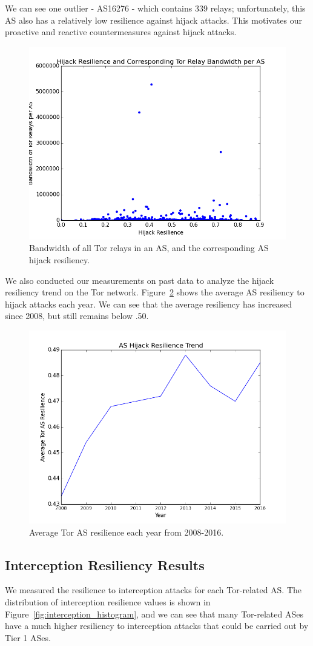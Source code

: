 We can see one outlier - AS16276 - which contains 339 relays; unfortunately, this AS also has a relatively low resilience against hijack attacks.  This motivates our proactive and reactive countermeasures against hijack attacks.

\begin{figure}
\centering
\includegraphics[width=.5\textwidth]{hijack_bandwidth}
\caption{Bandwidth of all Tor relays in an AS, and the corresponding AS hijack resiliency.}
\label{fig:hijack_bw}
\end{figure}

We also conducted our measurements on past data to analyze the hijack resiliency trend on the Tor network.  Figure~\ref{fig:resilience_trend} shows the average AS resiliency to hijack attacks each year.  We can see that the average resiliency has increased since 2008, but still remains below .50.  

\begin{figure}
\centering
\includegraphics[width=.5\textwidth]{hijack_resilience_trend}
\caption{Average Tor AS resilience each year from 2008-2016.}
\label{fig:resilience_trend}
\end{figure}

\subsection{Interception Resiliency Results}

We measured the resilience to interception attacks for each Tor-related AS.  The distribution of interception resilience values is shown in Figure~\ref{fig:interception_histogram}, and we can see that many Tor-related ASes have a much higher resiliency to interception attacks that could be carried out by Tier 1 ASes.  

